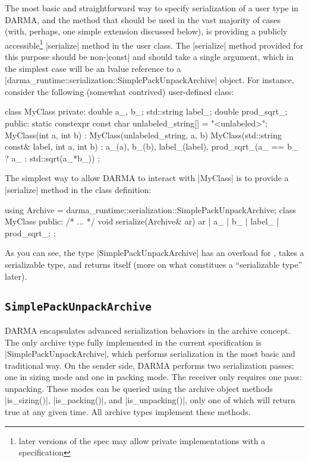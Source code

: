 The most basic and straightforward way to specify serialization of a user type
in DARMA, and the method that should be used in the vast majority of cases
(with, perhaps, one simple extension discussed below), is providing a publicly
accessible\footnote{later versions of the spec may allow private
implementations with a  specification} |serialize| method
in the user class.  The |serialize| method provided for this purpose should be
non-|const| and should take a single argument, which in the simplest case will
be an lvalue reference to a
|darma_runtime::serialization::SimplePackUnpackArchive| object.  For instance,
consider the following (somewhat contrived) user-defined class:
%
\begin{CppCodeNumb}
class MyClass {
  private:
    double a_, b_;
    std::string label_;
    double prod_sqrt_;
  public:
    static constexpr const char unlabeled_string[] = "<unlabeled>";
    MyClass(int a, int b)
      : MyClass(unlabeled_string, a, b)
    { }
    MyClass(std::string const& label, int a, int b)
      : a_(a), b_(b), label_(label),
        prod_sqrt_(a_ == b_ ? a_ : std::sqrt(a_*b_))
    { }
};
\end{CppCodeNumb}
%
The simplest way to allow DARMA to interact with |MyClass| is to provide
a |serialize| method in the class definition:
\begin{CppCodeNumb}
using Archive = darma_runtime::serialization::SimplePackUnpackArchive;
class MyClass {
  public:
    /* ... */
    void serialize(Archive& ar) {
      ar | a_ | b_ | label_ | prod_sqrt_;
    }
};
\end{CppCodeNumb}
As you can see, the type |SimplePackUnpackArchive| has an overload for
, takes a serializable type, and returns itself (more
on what constitues a ``serializable type'' later).

\subsection{\texttt{SimplePackUnpackArchive}}

DARMA encapsulates advanced serialization behaviors in the archive
\gls{concept}.  The only archive type fully implemented in the current
specification is |SimplePackUnpackArchive|, which performs serialization in the
most basic and traditional way.  On the sender side, DARMA performs
two serialization passes: one in sizing mode and one in packing mode.  The receiver
only requires one pass: unpacking.  These modes can be queried using the archive
object methods |is_sizing()|, |is_packing()|, and |is_unpacking()|, only
one of which will return true at any given time.  All archive types
implement these methods.

